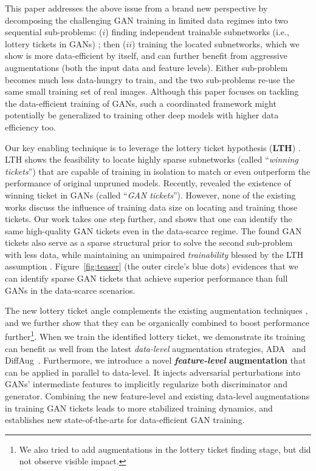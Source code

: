 \documentclass{article}
\begin{document}
This paper addresses the above issue from a brand new perspective by decomposing the challenging GAN training in limited data regimes into two sequential sub-problems: ($i$) finding independent trainable subnetworks (i.e., lottery tickets in GANs) \cite{chen2021gans,Kalibhat2020WinningLT}; then ($ii$) training the located subnetworks, which we show is more data-efficient by itself, and can further benefit from aggressive augmentations (both the input data and feature levels). 
Either sub-problem becomes much less data-hungry to train, and the two sub-problems re-use the same small training set of real images. Although this paper focuses on tackling the data-efficient training of GANs, such a coordinated framework might potentially be generalized to training other deep models with higher data efficiency too.

Our key enabling technique is to leverage the lottery ticket hypothesis (\textbf{LTH}) \cite{Frankle:2019vz}. LTH shows the feasibility to locate highly sparse subnetworks (called ``\textit{winning tickets}'') that are capable of training in isolation to match or even outperform the performance of original unpruned models. Recently, \cite{Kalibhat2020WinningLT,chen2021gans} revealed the existence of winning ticket in GANs (called ``\textit{GAN tickets}''). However, none of the existing works discuss the influence of training data size on locating and training those tickets. Our work takes one step further, and shows that one can identify the same high-quality GAN tickets even in the data-scarce regime. The found GAN tickets also serve as a sparse structural prior to solve the second sub-problem with less data, while maintaining an unimpaired \textit{trainability} blessed by the LTH assumption \cite{Frankle:2019vz}. Figure~\ref{fig:teaser} (the outer circle's blue dots) evidences that we can identify sparse GAN tickets that achieve superior performance than full GANs in the data-scarce scenarios. 

The new lottery ticket angle complements the existing augmentation techniques \cite{tran2020towards,zhang2019consistency,zhao2020improved}, and we further show that they can be organically combined to boost performance further\footnote{We also tried to add augmentations in the lottery ticket finding stage, but did not observe visible impact.}. When we train the identified lottery ticket, we demonstrate its training can benefit as well from the latest \textit{data-level} augmentation strategies,  ADA~\citep{karras2020training} and DiffAug~\citep{zhao2020diffaugment}. Furthermore, we introduce a novel \textbf{\textit{feature-level} augmentation} that can be applied in parallel to data-level. It injects adversarial perturbations into GANs' intermediate features to implicitly regularize both discriminator and generator. Combining the new feature-level and existing data-level augmentations in training GAN tickets leads to more stabilized training dynamics, and establishes new state-of-the-arts for data-efficient GAN training.
\end{document}
